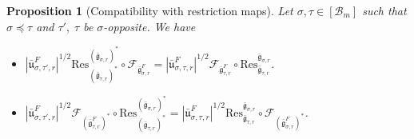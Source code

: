 \documentclass[11 pt]{article}
\numberwithin{equation}{subsection}
\newtheorem{proposition}[theorem]{Proposition}
\theoremstyle{definition}
\theoremstyle{remark}
\theoremstyle{conjecture}
\newcommand{\bg}{\bar{\mathfrak g}}
\newcommand{\bu}{\bar{\mathfrak u}}
\newcommand{\mcF}{\mathcal F}
\newcommand{\B}{\mathcal{B}}
\begin{document}
\begin{proposition}[Compatibility with restriction maps]\label{fourierres}
    Let $\sigma, \tau \in [\B_m]$ such that $\sigma \preceq \tau$ and $\tau',\;\tau $ be $\sigma$-opposite. We have 
    \begin{itemize}
        \item [(i)] $ \left|\bu_{\sigma,\tau',r}^F\right|^{1/2}\mathrm{Res}^{(\bg_{\sigma,r})^*}_{(\bg_{\tau,r})^*} \circ \mcF_{\bg_{\sigma,r}^F} = \left|\bu_{\sigma,\tau,r}^F\right|^{1/2}\mcF_{\bg_{\tau,r}^F} \circ \mathrm{Res}^{\bg_{\sigma,r}}_{\bg_{\tau,r}} $.
        \item[(ii)] $\left|\bu_{\sigma,\tau',r}^F\right|^{1/2}\mcF_{(\bg_{\tau,r}^F)^*}\circ \mathrm{Res}^{(\bg_{\sigma,r})^*}_{(\bg_{\tau,r})^*}= \left|\bu_{\sigma,\tau,r}^F\right|^{1/2}\mathrm{Res}^{\bg_{\sigma,r}}_{\bg_{\tau,r}} \circ \mcF_{(\bg_{\sigma,r}^F)^*}$. 
    \end{itemize}
\end{proposition}
\end{document}
